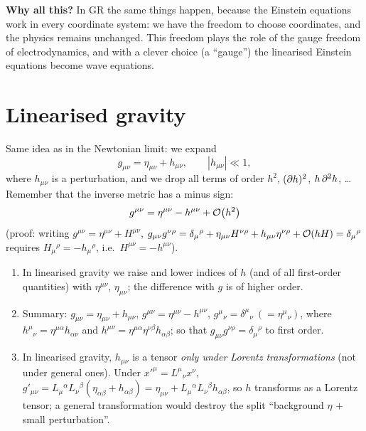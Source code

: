 \textbf{Why all this?} In GR the same things happen, because the Einstein equations work in every coordinate system: we have the freedom to choose coordinates, and the physics remains unchanged. This freedom plays the role of the gauge freedom of electrodynamics, and with a clever choice (a ``gauge'') the linearised Einstein equations become wave equations.

\section{Linearised gravity}

Same idea as in the Newtonian limit: we expand
\begin{equation}
  g_{\mu\nu}=\eta_{\mu\nu}+h_{\mu\nu},\qquad|h_{\mu\nu}|\ll1 ,
\end{equation}
where $h_{\mu\nu}$ is a perturbation, and we drop all terms of order $h^2$, $(\partial h)^2$, $h\,\partial^2h$, \dots Remember that the inverse metric has a minus sign:
\begin{equation}
  g^{\mu\nu}=\eta^{\mu\nu}-h^{\mu\nu}+\mathcal{O}\!\left(h^2\right)
\end{equation}
(proof: writing $g^{\mu\nu}=\eta^{\mu\nu}+H^{\mu\nu}$, $g_{\mu\nu}g^{\nu\rho}=\delta_\mu{}^\rho+\eta_{\mu\nu}H^{\nu\rho}+h_{\mu\nu}\eta^{\nu\rho}+\mathcal{O}\!\left(hH\right)=\delta_\mu{}^\rho$ requires $H_\mu{}^\rho=-h_\mu{}^\rho$, i.e.\ $H^{\mu\nu}=-h^{\mu\nu}$).

\begin{remarkbox}[Remarks]
\begin{enumerate}[label=(\roman*),nosep]
\item In linearised gravity we raise and lower indices of $h$ (and of all first-order quantities) with $\eta^{\mu\nu}$, $\eta_{\mu\nu}$; the difference with $g$ is of higher order.
\item Summary: $g_{\mu\nu}=\eta_{\mu\nu}+h_{\mu\nu}$, $g^{\mu\nu}=\eta^{\mu\nu}-h^{\mu\nu}$, $g^\mu{}_\nu=\delta^\mu{}_\nu\ (=\eta^\mu{}_\nu)$, where $h^\mu{}_\nu=\eta^{\mu\alpha}h_{\alpha\nu}$ and $h^{\mu\nu}=\eta^{\mu\alpha}\eta^{\nu\beta}h_{\alpha\beta}$; so that $g_{\mu\nu}g^{\nu\rho}=\delta_\mu{}^\rho$ to first order.
\item In linearised gravity, $h_{\mu\nu}$ is a tensor \emph{only under Lorentz transformations} (not under general ones). Under $x'^\mu=L^\mu{}_\nu x^\nu$, $g'_{\mu\nu}=L_\mu{}^\alpha L_\nu{}^\beta(\eta_{\alpha\beta}+h_{\alpha\beta})=\eta_{\mu\nu}+L_\mu{}^\alpha L_\nu{}^\beta h_{\alpha\beta}$, so $h$ transforms as a Lorentz tensor; a general transformation would destroy the split ``background $\eta$ $+$ small perturbation''.
\end{enumerate}
\end{remarkbox}

